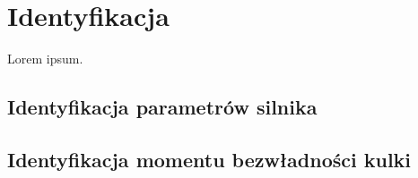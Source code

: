 \chapter{Identyfikacja}
\label{cha:ch6_identyfikacja}

Lorem ipsum.

\section{Identyfikacja parametrów silnika}
\label{sec:identyfikacja_parametrow_silnika}

\section{Identyfikacja momentu bezwładności kulki}
\label{sec:identyfikacja_bezwladnosci_kulki}

